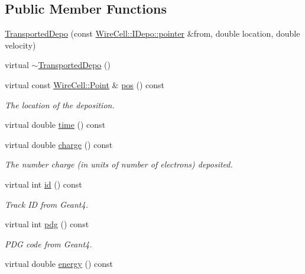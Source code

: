 \subsection*{Public Member Functions}
\begin{DoxyCompactItemize}
\item 
\hyperlink{class_wire_cell_1_1_gen_1_1_transported_depo_a8b1fc8d134da6e7a574e55768f93db11}{Transported\+Depo} (const \hyperlink{class_wire_cell_1_1_i_data_aff870b3ae8333cf9265941eef62498bc}{Wire\+Cell\+::\+I\+Depo\+::pointer} \&from, double location, double velocity)
\item 
virtual \hyperlink{class_wire_cell_1_1_gen_1_1_transported_depo_a787f57e2f482cd44c4fbae28ea234e41}{$\sim$\+Transported\+Depo} ()
\item 
virtual const \hyperlink{namespace_wire_cell_ab2b2565fa6432efbb4513c14c988cda9}{Wire\+Cell\+::\+Point} \& \hyperlink{class_wire_cell_1_1_gen_1_1_transported_depo_adc6089147221a0e27445f167969bd26d}{pos} () const
\begin{DoxyCompactList}\small\item\em The location of the deposition. \end{DoxyCompactList}\item 
virtual double \hyperlink{class_wire_cell_1_1_gen_1_1_transported_depo_aa4f72056a68d1484c8d84fb27b3acacf}{time} () const
\item 
virtual double \hyperlink{class_wire_cell_1_1_gen_1_1_transported_depo_a448ef0f9244cb3802103f0e15afaa7fa}{charge} () const
\begin{DoxyCompactList}\small\item\em The number charge (in units of number of electrons) deposited. \end{DoxyCompactList}\item 
virtual int \hyperlink{class_wire_cell_1_1_gen_1_1_transported_depo_a90f1faf2049eea77065f41492c18256a}{id} () const
\begin{DoxyCompactList}\small\item\em Track ID from Geant4. \end{DoxyCompactList}\item 
virtual int \hyperlink{class_wire_cell_1_1_gen_1_1_transported_depo_aa03cc0948c471aa8116e8ec62e284cea}{pdg} () const
\begin{DoxyCompactList}\small\item\em P\+DG code from Geant4. \end{DoxyCompactList}\item 
virtual double \hyperlink{class_wire_cell_1_1_gen_1_1_transported_depo_a126a3460f7f190b9049bfbbe1b988607}{energy} () const

\end{DoxyCompactItemize}
